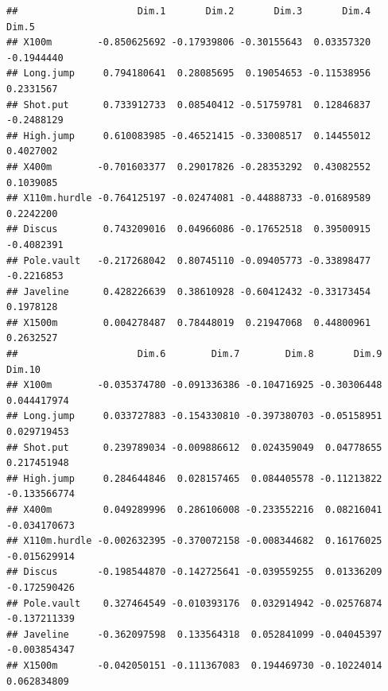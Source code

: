 \documentclass[
]{book}
\newenvironment{Shaded}{\begin{snugshade}}{\end{snugshade}}
\newcommand{\CommentTok}[1]{\textcolor[rgb]{0.56,0.35,0.01}{\textit{#1}}}
\newcommand{\NormalTok}[1]{#1}
\newcommand{\SpecialCharTok}[1]{\textcolor[rgb]{0.81,0.36,0.00}{\textbf{#1}}}
\begin{document}
\begin{verbatim}
##                     Dim.1       Dim.2       Dim.3       Dim.4      Dim.5
## X100m        -0.850625692 -0.17939806 -0.30155643  0.03357320 -0.1944440
## Long.jump     0.794180641  0.28085695  0.19054653 -0.11538956  0.2331567
## Shot.put      0.733912733  0.08540412 -0.51759781  0.12846837 -0.2488129
## High.jump     0.610083985 -0.46521415 -0.33008517  0.14455012  0.4027002
## X400m        -0.701603377  0.29017826 -0.28353292  0.43082552  0.1039085
## X110m.hurdle -0.764125197 -0.02474081 -0.44888733 -0.01689589  0.2242200
## Discus        0.743209016  0.04966086 -0.17652518  0.39500915 -0.4082391
## Pole.vault   -0.217268042  0.80745110 -0.09405773 -0.33898477 -0.2216853
## Javeline      0.428226639  0.38610928 -0.60412432 -0.33173454  0.1978128
## X1500m        0.004278487  0.78448019  0.21947068  0.44800961  0.2632527
##                     Dim.6        Dim.7        Dim.8       Dim.9       Dim.10
## X100m        -0.035374780 -0.091336386 -0.104716925 -0.30306448  0.044417974
## Long.jump     0.033727883 -0.154330810 -0.397380703 -0.05158951  0.029719453
## Shot.put      0.239789034 -0.009886612  0.024359049  0.04778655  0.217451948
## High.jump     0.284644846  0.028157465  0.084405578 -0.11213822 -0.133566774
## X400m         0.049289996  0.286106008 -0.233552216  0.08216041 -0.034170673
## X110m.hurdle -0.002632395 -0.370072158 -0.008344682  0.16176025 -0.015629914
## Discus       -0.198544870 -0.142725641 -0.039559255  0.01336209 -0.172590426
## Pole.vault    0.327464549 -0.010393176  0.032914942 -0.02576874 -0.137211339
## Javeline     -0.362097598  0.133564318  0.052841099 -0.04045397 -0.003854347
## X1500m       -0.042050151 -0.111367083  0.194469730 -0.10224014  0.062834809
\end{verbatim}

\begin{Shaded}
\end{Shaded}
\end{document}
